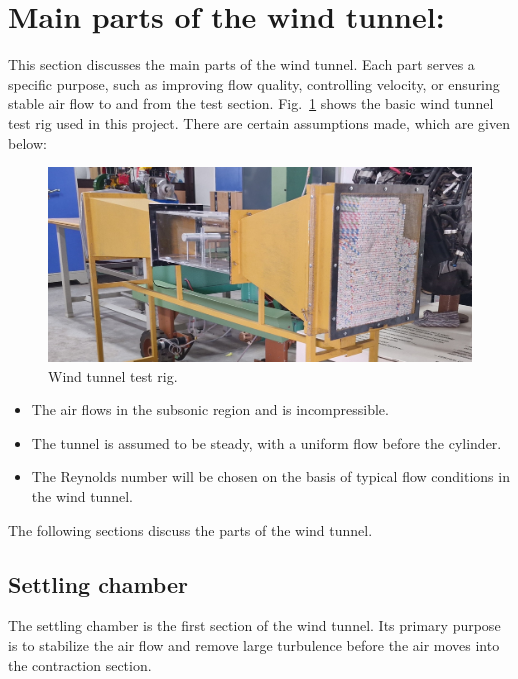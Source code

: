 \section{Main parts of the wind tunnel:}

This section discusses the main parts of the wind tunnel. Each part serves a specific purpose, such as improving flow quality, controlling velocity, or ensuring stable air flow to and from the test section. Fig.~\ref{fig:wind_tunnel} shows the basic wind tunnel test rig used in this project. There are certain assumptions made, which are given below:

\begin{figure}[h]
    \centering
    \includegraphics[width=0.9\linewidth]{gfx/windtunnel.jpg}
    \caption{Wind tunnel test rig.}
    \label{fig:wind_tunnel}
\end{figure}

\begin{itemize}

\item The air flows in the subsonic region and is incompressible.

\item The tunnel is assumed to be steady, with a uniform flow before the cylinder.

\item The Reynolds number will be chosen on the basis of typical flow conditions in the wind tunnel.

\end{itemize}
The following sections discuss the parts of the wind tunnel.
\subsection{Settling chamber}

The settling chamber is the first section of the wind tunnel. Its primary purpose is to stabilize the air flow and remove large turbulence before the air moves into the contraction section.

